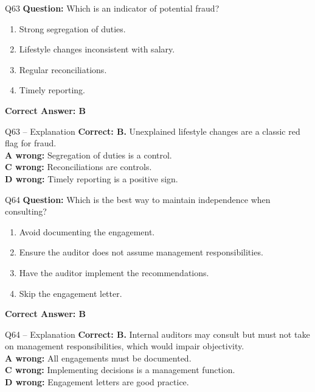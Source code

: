 \documentclass[aspectratio=169,10pt]{beamer}
\begin{document}
	\begin{frame}[t]{Q63}
		\small
		\textbf{Question:} Which is an indicator of potential fraud?
		\begin{enumerate}[label=\Alph*.,itemsep=1pt,topsep=2pt]
			\item Strong segregation of duties.
			\item Lifestyle changes inconsistent with salary.
			\item Regular reconciliations.
			\item Timely reporting.
		\end{enumerate}
		\vspace{4pt}
		\textbf{Correct Answer: B}
	\end{frame}
	
	\begin{frame}[t]{Q63 -- Explanation}
		\small
		\textbf{Correct: B.} Unexplained lifestyle changes are a classic red flag for fraud. \\[4pt]
		\textbf{A wrong:} Segregation of duties is a control. \\[2pt]
		\textbf{C wrong:} Reconciliations are controls. \\[2pt]
		\textbf{D wrong:} Timely reporting is a positive sign.
	\end{frame}
	
	\begin{frame}[t]{Q64}
		\small
		\textbf{Question:} Which is the best way to maintain independence when consulting?
		\begin{enumerate}[label=\Alph*.,itemsep=1pt,topsep=2pt]
			\item Avoid documenting the engagement.
			\item Ensure the auditor does not assume management responsibilities.
			\item Have the auditor implement the recommendations.
			\item Skip the engagement letter.
		\end{enumerate}
		\vspace{4pt}
		\textbf{Correct Answer: B}
	\end{frame}
	
	\begin{frame}[t]{Q64 -- Explanation}
		\small
		\textbf{Correct: B.} Internal auditors may consult but must not take on management responsibilities, which would impair objectivity. \\[4pt]
		\textbf{A wrong:} All engagements must be documented. \\[2pt]
		\textbf{C wrong:} Implementing decisions is a management function. \\[2pt]
		\textbf{D wrong:} Engagement letters are good practice.
	\end{frame}
	
\end{document}
